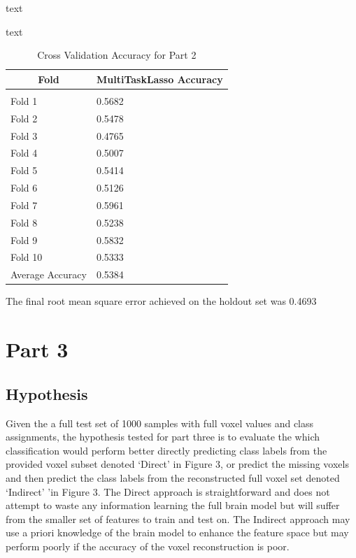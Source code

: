 \documentclass{article} %
\begin{document}
text

text

\begin{table}[h]
\caption{Cross Validation Accuracy for Part 2}
\label{classtable}
\begin{center}
	\begin{tabular}{ll}
		\multicolumn{1}{c}{\bf Fold}  &\multicolumn{1}{c}{\bf MultiTaskLasso Accuracy} 
		\\ \hline \\
		Fold 1   &0.5682 \\
		Fold 2   &0.5478 \\
		Fold 3   &0.4765 \\
		Fold 4   &0.5007   \\
		Fold 5   &0.5414   \\
		Fold 6   &0.5126   \\
		Fold 7   &0.5961 \\
		Fold 8   &0.5238 \\
		Fold 9   &0.5832 \\
		Fold 10   &0.5333 \\
		Average Accuracy   &0.5384\\
	\end{tabular}
\end{center}
\end{table} 

The final root mean square error achieved on the holdout set was 0.4693

\section{Part 3}

\subsection{Hypothesis}
Given the a full test set of 1000 samples with full voxel values and class assignments, the hypothesis tested for part three is to evaluate the which classification would perform better directly predicting class labels from the provided voxel subset denoted ‘Direct’ in Figure 3,  or predict the missing voxels and then predict the class labels from the reconstructed full voxel set denoted ‘Indirect’ ’in Figure 3.  The Direct approach is straightforward and does not attempt to waste any information learning the full brain model but will suffer from the smaller set of features to train and test on. The Indirect approach may use a priori knowledge of the brain model to enhance the feature space but may perform poorly if the accuracy of the voxel reconstruction is poor.
\end{document}
